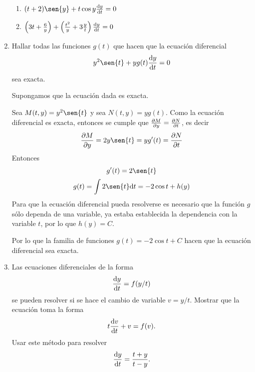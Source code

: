 \documentclass[14pt]{extarticle}
\begin{document}
\begin{enumerate}
{\begin{enumerate}
                \item {
                    $(t+2)\sen{y}+t\cos{y}\dv{y}{t}=0$

                    \color{azul}
                }
                
                \item {
                    $\left(3t+\frac{6}{y}\right)
                    +\left(\frac{t^2}{y}+3\frac{y}{t}\right)\dv{y}{t}=0$

                    \color{azul}
                }
            \end{enumerate}
        }
        
        \pagebreak
        \item {
            Hallar todas las funciones $g(t)$ que hacen que la ecuación
            diferencial $$y^2\sen{t}+yg(t)\dv{y}{t}=0$$ sea exacta.

            \color{azul}
            Supongamos que la ecuación dada es exacta.
            
            Sea $M(t,y)=y^2\sen{t}$ y sea $N(t,y)=yg(t)$. Como la ecuación
            diferencial es exacta, entonces se cumple que
            $\pdv{M}{y}=\pdv{N}{t}$, es decir
            $$\pdv{M}{y}=2y\sen{t}=yg'(t)=\pdv{N}{t}$$
            Entonces
            $$g'(t)=2\sen{t}$$
            $$g(t)=\int{2\sen{t}\dd t}=-2\cos{t}+h(y)$$
            Para que la ecuación diferencial pueda resolverse es necesario que
            la función $g$ sólo dependa de una variable, ya estaba establecida
            la dependencia con la variable $t$, por lo que $h(y)=C$.

            Por lo que la familia de funciones $g(t)=-2\cos{t}+C$ hacen que la
            ecuación diferencial sea exacta.
        }
        
        \pagebreak
        \item {
            Las ecuaciones diferenciales de la forma $$\dv{y}{t}=f(y/t)$$ se
            pueden resolver si se hace el cambio de variable $v=y/t$. Mostrar
            que la ecuación toma la forma $$t\dv{v}{t}+v=f(v).$$ Usar este
            método para resolver $$\dv{y}{t}=\frac{t+y}{t-y}.$$

}
\end{enumerate}
\end{document}
